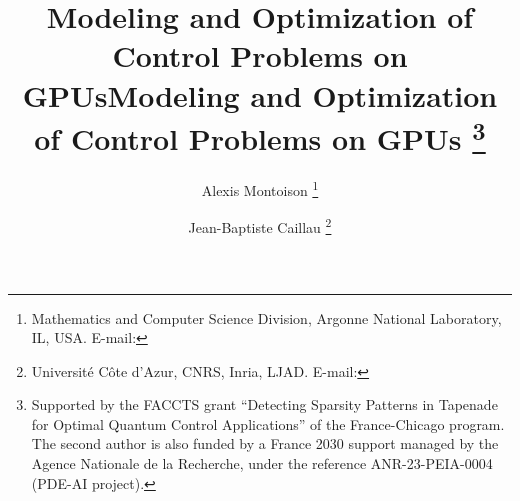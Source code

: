 \ifblind
    \title{Modeling and Optimization of Control Problems on GPUs}
\else
    \title{Modeling and Optimization of Control Problems on GPUs
    \thanks{%
    Supported by the FACCTS grant ``Detecting Sparsity Patterns in Tapenade for Optimal Quantum Control Applications'' of the France-Chicago program.
    The second author is also funded by a France 2030 support managed by the Agence Nationale de la Recherche, under the reference ANR-23-PEIA-0004 (PDE-AI project).}}
\fi

\ifblind
  \author{}
\else
  \author{%
    Alexis Montoison%
    \thanks{%
      Mathematics and Computer Science Division, Argonne National Laboratory, IL, USA.
      E-mail: 
    }
    \and
    Jean-Baptiste Caillau%
    \thanks{%
      Universit\'e C\^ote d'Azur, CNRS, Inria, LJAD.
      E-mail: 
    }
  }
\fi

\date{}

\maketitle


\ifblind
{}
\fi





